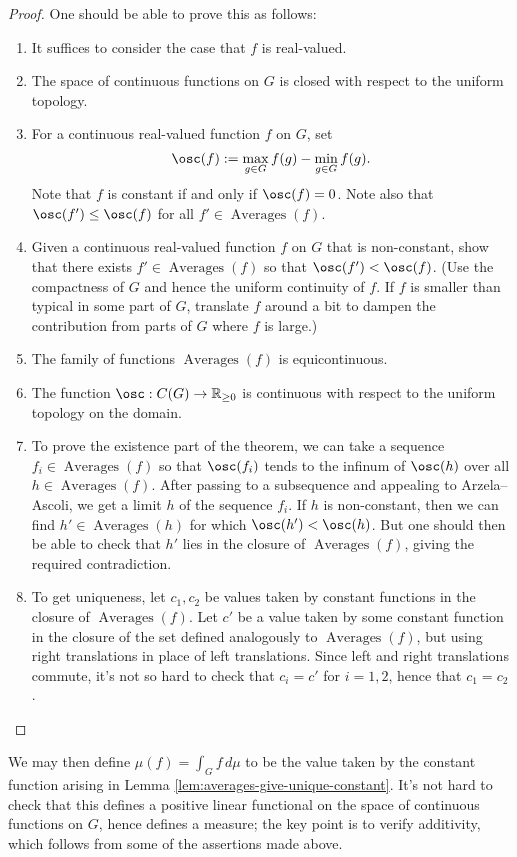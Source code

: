 \documentclass[reqno]{amsart} 
\begin{document}
\begin{proof}
  One should be able to prove this
  as follows:
  \begin{enumerate}
  \item It suffices to consider the case that $f$ is real-valued.
  \item The space of continuous functions on $G$ is closed
    with respect to the uniform topology.
  \item
    For a continuous real-valued function $f$ on $G$,
    set
    \begin{equation*}
      \osc(f) := \max_{g \in G} f(g) - \min_{g \in G} f(g).
    \end{equation*}
    Note that $f$ is constant if and only if $\osc(f) = 0$.
    Note also that $\osc(f') \leq \osc(f)$ for all $f' \in \operatorname{Averages}(f)$.
  \item
    Given a continuous real-valued function $f$ on $G$
    that is non-constant,
    show that there exists $f' \in \operatorname{Averages}(f)$
    so that $\osc(f') < \osc(f)$.
    (Use the compactness of $G$ and hence the uniform
    continuity of $f$.
    If $f$ is smaller than typical in some part of $G$,
    translate $f$ around a bit to dampen the contribution
    from parts of $G$ where $f$ is large.)
  \item The family of functions $\operatorname{Averages}(f)$
    is equicontinuous.
  \item The function
    $\osc : C(G) \rightarrow \mathbb{R}_{\geq 0}$ is continuous
    with respect to the uniform topology on the domain.
  \item To prove the existence part of the theorem,
    we can take a sequence $f_i \in \operatorname{Averages}(f)$
    so that $\osc(f_i)$ tends to the infinum
    of $\osc(h)$ over all $h \in \operatorname{Averages}(f)$.
    After passing
    to a subsequence and appealing to Arzela--Ascoli,
    we get a limit $h$ of the sequence $f_i$.
    If $h$ is non-constant, then we can find
    $h' \in \operatorname{Averages}(h)$ for which $\osc(h') < \osc(h)$.
    But one should then be able to check that $h'$
    lies in the closure of $\operatorname{Averages}(f)$,
    giving the required contradiction.
  \item
    To get uniqueness,
    let $c_1,c_2$ be values taken by constant functions
    in the closure of $\operatorname{Averages}(f)$.
    Let $c'$ be a value taken by some constant function
    in the closure of the set defined analogously
    to $\operatorname{Averages}(f)$, but using right translations in place of
    left translations.
    Since left and right translations commute, it's not so hard
    to check that $c_i = c'$ for $i=1,2$,
    hence that $c_1 =c_2$.
  \end{enumerate}
\end{proof}
We may then define $\mu(f) = \int_G f \, d \mu$
to be the value taken by the constant function
arising in Lemma \ref{lem:averages-give-unique-constant}.
It's not hard to check that this defines a positive
linear functional on the space of continuous functions on $G$,
hence defines a measure;
the key point is to verify additivity, which follows
from some of the assertions made above.
\end{document}
